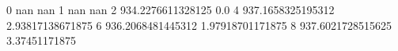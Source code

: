 0 nan nan
1 nan nan
2 934.2276611328125 0.0
4 937.1658325195312 2.93817138671875
6 936.2068481445312 1.97918701171875
8 937.6021728515625 3.37451171875
